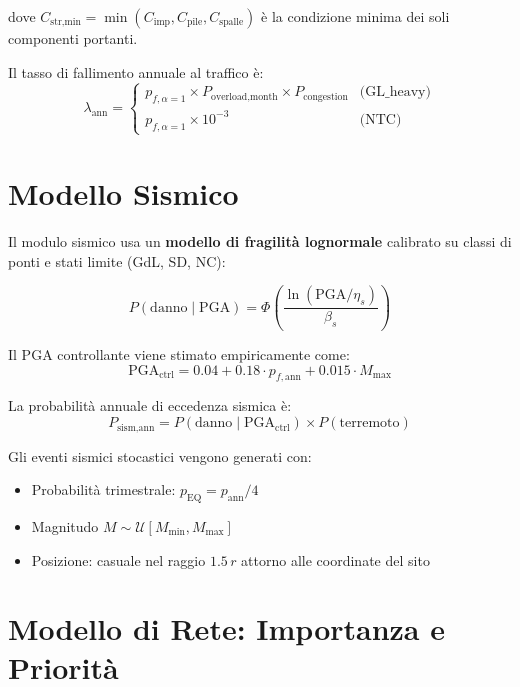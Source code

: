 \documentclass[11pt,a4paper]{article}
\begin{document}
dove $C_{\text{str,min}} = \min(C_{\text{imp}}, C_{\text{pile}}, C_{\text{spalle}})$ \`e la condizione minima dei soli componenti portanti.

Il tasso di fallimento annuale al traffico \`e:
\begin{equation}
  \lambda_{\text{ann}} = \begin{cases}
    p_{f,\alpha=1} \times P_{\text{overload,month}} \times P_{\text{congestion}} & \text{(GL\_heavy)} \\
    p_{f,\alpha=1} \times 10^{-3} & \text{(NTC)}
  \end{cases}
\end{equation}

\section{Modello Sismico}

Il modulo sismico usa un \textbf{modello di fragilità lognormale} calibrato su classi di ponti e stati limite (GdL, SD, NC):

\begin{equation}
  P(\text{danno} \mid \text{PGA}) = \Phi\!\left(\frac{\ln(\text{PGA}/\eta_s)}{\beta_s}\right)
\end{equation}

Il PGA controllante viene stimato empiricamente come:
\begin{equation}
  \text{PGA}_{\text{ctrl}} = 0.04 + 0.18 \cdot p_{f,\text{ann}} + 0.015 \cdot M_{\text{max}}
\end{equation}

La probabilit\`a annuale di eccedenza sismica \`e:
\begin{equation}
  P_{\text{sism,ann}} = P(\text{danno} \mid \text{PGA}_{\text{ctrl}}) \times P(\text{terremoto})
\end{equation}

Gli eventi sismici stocastici vengono generati con:
\begin{itemize}
  \item Probabilit\`a trimestrale: $p_{\text{EQ}} = p_{\text{ann}} / 4$
  \item Magnitudo $M \sim \mathcal{U}[M_{\min}, M_{\max}]$
  \item Posizione: casuale nel raggio $1.5\,r$ attorno alle coordinate del sito
\end{itemize}

\section{Modello di Rete: Importanza e Priorità}
\end{document}
